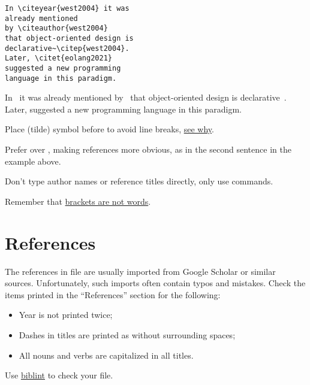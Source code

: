 \documentclass[12pt,nonacm,natbib=false]{acmart}
\begin{document}
\begin{multicols}{2}
\setlength{\parskip}{0pt}
\small
\raggedcolumns
\begin{verbatim}
In \citeyear{west2004} it was
already mentioned
by \citeauthor{west2004}
that object-oriented design is
declarative~\citep{west2004}.
Later, \citet{eolang2021}
suggested a new programming
language in this paradigm.
\end{verbatim}

\columnbreak

\raggedright
In~\citeyear{west2004} it was already
mentioned by~\citeauthor{west2004} that
object-oriented design is
declarative~\citep{west2004}.
Later, \citet{eolang2021}
suggested a new programming
language in this paradigm.

\AtNextBibliography{\small}
\setlength\bibitemsep{3pt}
{\raggedright\printbibliography[heading=none]}
\end{multicols}

Place \ff{\~} (tilde) symbol before  to avoid line breaks, \href{https://tex.stackexchange.com/questions/41264/what-is-the-difference-in-citing-referencing-with-or-without-tilde}{see why}.

Prefer  over , making references more obvious, as in the second sentence in the example above.

Don't type author names or reference titles directly, only use  commands.

Remember that \href{https://www.ece.ucdavis.edu/~jowens/biberrors.html}{brackets are not words}.

\section{References}

The references in  file are usually imported from Google Scholar or similar sources. Unfortunately, such imports often contain typos and mistakes. Check the items printed in the ``References'' section for the following:

\begin{itemize}
    \item Year is not printed twice;
    \item Dashes in titles are printed as \ff{-{}-{}-} without surrounding spaces;
    \item All nouns and verbs are capitalized in all titles.
\end{itemize}

Use \href{https://github.com/Kingsford-Group/biblint}{biblint} to check your  file.
\end{document}
